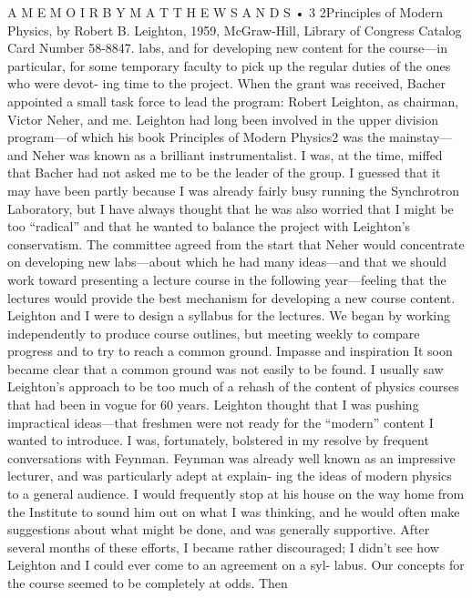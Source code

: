 \documentclass[11pt,oneside]{article}
\begin{document}
A  M E M O I R  B Y  M A T T H E W  S A N D S • 3 2Principles of Modern Physics, by Robert B. Leighton, 1959, McGraw-Hill, Library of Congress Catalog Card Number 58-8847. labs, and for developing new content for the course---in particular, for some temporary faculty to pick up the regular duties of the ones who were devot- ing time to the project. When the grant was received, Bacher appointed a small task force to lead the program: Robert Leighton, as chairman, Victor Neher, and me. Leighton had long been involved in the upper division program---of which his book Principles of Modern Physics2 was the mainstay---and Neher was known as a brilliant instrumentalist. I was, at the time, miffed that Bacher had not asked me to be the leader of the group. I guessed that it may have been partly because I was already fairly busy running the Synchrotron Laboratory, but I have always thought that he was also worried that I might be too “radical” and that he wanted to balance the project with Leighton’s conservatism. The committee agreed from the start that Neher would concentrate on developing new labs---about which he had many ideas---and that we should work toward presenting a lecture course in the following year---feeling that the lectures would provide the best mechanism for developing a new course content. Leighton and I were to design a syllabus for the lectures. We began by working independently to produce course outlines, but meeting weekly to compare progress and to try to reach a common ground. Impasse and inspiration It soon became clear that a common ground was not easily to be found. I usually saw Leighton’s approach to be too much of a rehash of the content of physics courses that had been in vogue for 60 years. Leighton thought that I was pushing impractical ideas---that freshmen were not ready for the “modern” content I wanted to introduce. I was, fortunately, bolstered in my resolve by frequent conversations with Feynman. Feynman was already well known as an impressive lecturer, and was particularly adept at explain- ing the ideas of modern physics to a general audience. I would frequently stop at his house on the way home from the Institute to sound him out on what I was thinking, and he would often make suggestions about what might be done, and was generally supportive. After several months of these efforts, I became rather discouraged; I didn’t see how Leighton and I could ever come to an agreement on a syl- labus. Our concepts for the course seemed to be completely at odds. Then\par
\end{document}
